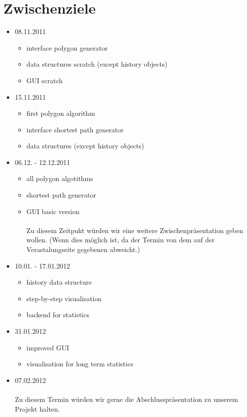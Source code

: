 \documentclass[10pt,a4paper,fleqn]{article}
\begin{document}
  \section*{Zwischenziele}
    \begin{itemize}
    \item 08.11.2011
      \begin{itemize}
        \item interface polygon generator
        \item data structures scratch (except history objects)
        \item GUI scratch
      \end{itemize}
      \item 15.11.2011
      \begin{itemize}
        \item first polygon algorithm
        \item interface shortest path generator
        \item data structures (except history objects)
      \end{itemize}
      \item 06.12. - 12.12.2011
        \begin{itemize}
          \item all polygon algotithms
          \item shortest path generator
          \item GUI basic version\\\\
          Zu diesem Zeitpukt würden wir eine weitere Zwischenpräsentation geben
        wollen. (Wenn dies möglich ist, da der Termin von dem auf der
        Verastalungseite gegebenen abweicht.)
        \end{itemize}
      \item 10.01. - 17.01.2012
        \begin{itemize}
          \item history data structure
          \item step-by-step visualisation
          \item backend for statistics
        \end{itemize}
      \item 31.01.2012
        \begin{itemize}
          \item improved GUI
          \item visualisation for long term statistics
        \end{itemize}
      \item 07.02.2012\\\\
        Zu diesem Termin würden wir gerne die
        Abschlusspräsentation zu unserem Projekt halten.
  \end{itemize}
    
    
\end{document}
